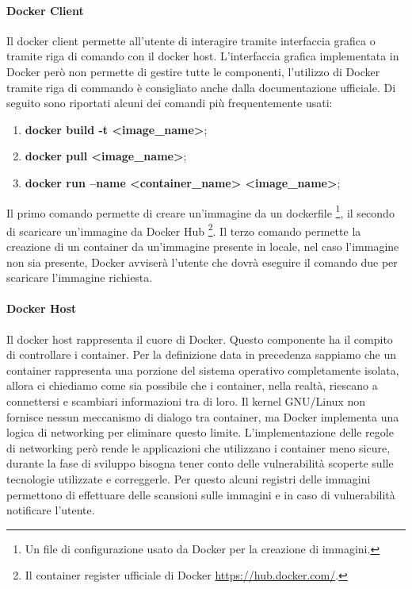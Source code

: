 \paragraph{Docker Client}
Il docker client permette all'utente di interagire tramite interfaccia grafica o tramite riga di comando con il docker host. L'interfaccia grafica implementata in Docker però non permette di gestire tutte le componenti, l'utilizzo di Docker tramite riga di commando è consigliato anche dalla documentazione ufficiale. Di seguito sono riportati alcuni dei comandi più frequentemente usati:

\begin{enumerate}
    \item \textbf{\textcolor{color_1}{docker build -t <image\_name>}};
    \item \textbf{\textcolor{color_1}{docker pull <image\_name>}};
    \item \textbf{\textcolor{color_1}{docker run --name <container\_name> <image\_name>}};
\end{enumerate}

Il primo comando permette di creare un'immagine da un dockerfile \footnote{Un file di configurazione usato da Docker per la creazione di immagini.}, il secondo di scaricare un'immagine da Docker Hub \footnote{Il container register ufficiale di Docker \url{https://hub.docker.com/}.}. Il terzo comando permette la creazione di un container da un'immagine presente in locale, nel caso l'immagine non sia presente, Docker avviserà l'utente che dovrà eseguire il comando due per scaricare l'immagine richiesta.


\paragraph{Docker Host}
Il docker host rappresenta il cuore di Docker. Questo componente ha il compito di controllare i container. Per la definizione data in precedenza sappiamo che un container rappresenta una porzione del sistema operativo completamente isolata, allora ci chiediamo come sia possibile che i container, nella realtà, riescano a connettersi e scambiari informazioni tra di loro. Il kernel GNU/Linux non fornisce nessun meccanismo di dialogo tra container, ma Docker implementa una logica di networking per eliminare questo limite. L'implementazione delle regole di networking però rende le applicazioni che utilizzano i container meno sicure, durante la fase di sviluppo bisogna tener conto delle vulnerabilità scoperte sulle tecnologie utilizzate e correggerle. Per questo alcuni registri delle immagini permettono di effettuare delle scansioni sulle immagini e in caso di vulnerabilità notificare l'utente.

